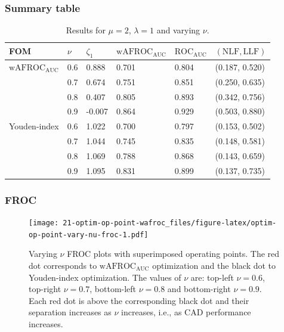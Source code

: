 \documentclass[
]{book}
\begin{document}
\hypertarget{summary-table-2}{%
\subsubsection{Summary table}\label{summary-table-2}}

\begin{table}

\caption{\label{tab:optim-op-point-table-vary-nu}Results for $\mu = 2$, $\lambda = 1$ and varying $\nu$.}
\centering
\fontsize{10}{12}\selectfont
\begin{tabular}[t]{llllll}
\toprule
FOM & $\nu$ & $\zeta_1$ & $\text{wAFROC}_\text{AUC}$ & $\text{ROC}_\text{AUC}$ & $\left( \text{NLF}, \text{LLF}\right)$\\
\midrule
$\text{wAFROC}_\text{AUC}$ & 0.6 & 0.888 & 0.701 & 0.804 & (0.187, 0.520)\\
 & 0.7 & 0.674 & 0.751 & 0.851 & (0.250, 0.635)\\
 & 0.8 & 0.407 & 0.805 & 0.893 & (0.342, 0.756)\\
 & 0.9 & -0.007 & 0.864 & 0.929 & (0.503, 0.880)\\
Youden-index & 0.6 & 1.022 & 0.700 & 0.797 & (0.153, 0.502)\\
\addlinespace
 & 0.7 & 1.044 & 0.745 & 0.835 & (0.148, 0.581)\\
 & 0.8 & 1.069 & 0.788 & 0.868 & (0.143, 0.659)\\
 & 0.9 & 1.095 & 0.831 & 0.899 & (0.137, 0.735)\\
\bottomrule
\end{tabular}
\end{table}

\hypertarget{froc-3}{%
\subsubsection{FROC}\label{froc-3}}

\begin{figure}
\centering
\texttt{[image: 21-optim-op-point-wafroc\_files/figure-latex/optim-op-point-vary-nu-froc-1.pdf]}
\caption{\label{fig:optim-op-point-vary-nu-froc}Varying \(\nu\) FROC plots with superimposed operating points. The red dot corresponds to \(\text{wAFROC}_\text{AUC}\) optimization and the black dot to Youden-index optimization. The values of \(\nu\) are: top-left \(\nu = 0.6\), top-right \(\nu = 0.7\), bottom-left \(\nu = 0.8\) and bottom-right \(\nu = 0.9\). Each red dot is above the corresponding black dot and their separation increases as \(\nu\) increases, i.e., as CAD performance increases.}
\end{figure}
\end{document}
